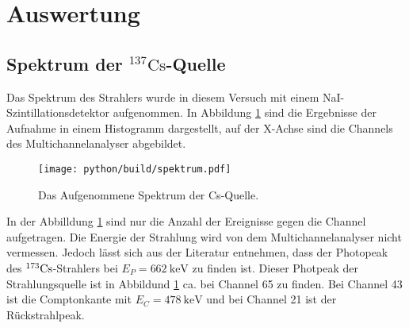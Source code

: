 \newpage 
\section{Auswertung}

  \subsection{Spektrum der $^{137}\text{Cs}$-Quelle}
    Das Spektrum des Strahlers wurde in diesem Versuch mit einem NaI-Szintillationsdetektor aufgenommen. 
    In Abbildung \ref{fig:Spektrum} sind die Ergebnisse der Aufnahme in einem Histogramm dargestellt, auf der X-Achse sind die Channels des Multichannelanalyser abgebildet.
    \begin{figure}[H]
      \centering  
      \texttt{[image: python/build/spektrum.pdf]}
      \label{fig:Spektrum}
      \caption{Das Aufgenommene Spektrum der Cs-Quelle.}
    \end{figure}

    \noindent In der Abbilldung \ref{fig:Spektrum} sind nur die Anzahl der Ereignisse gegen die Channel aufgetragen. 
    Die Energie der Strahlung wird von dem Multichannelanalyser nicht vermessen. 
    Jedoch lässt sich aus der Literatur \cite{Peak} entnehmen, dass der Photopeak des $^{173}\text{Cs}$-Strahlers bei $E_P = \SI{662}{\kilo\electronvolt}$ zu finden ist.
    Dieser Photpeak der Strahlungsquelle ist in Abbildund \ref{fig:Spektrum} ca. bei Channel 65 zu finden. 
    Bei Channel 43 ist die Comptonkante mit $E_C = \SI{478}{\kilo\electronvolt}$  und bei Channel 21 ist der Rückstrahlpeak.

